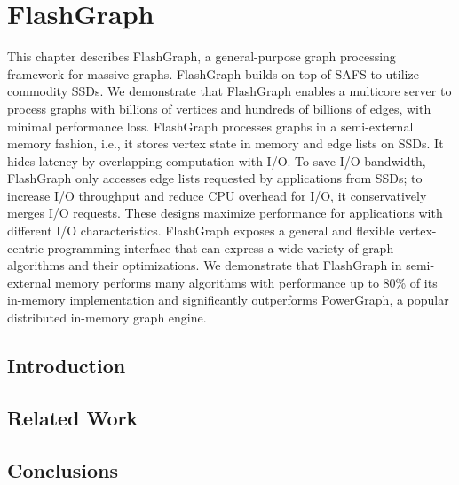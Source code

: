 \chapter{FlashGraph}
\label{sec:fg}

This chapter describes FlashGraph, a general-purpose graph processing framework
for massive graphs. FlashGraph builds on top of SAFS to utilize commodity SSDs.
We demonstrate that FlashGraph enables a multicore server to process graphs
with billions of vertices and hundreds of billions of edges, with minimal
performance loss. FlashGraph
processes graphs in a semi-external memory fashion, i.e., it stores vertex state
in memory and edge lists on SSDs. It hides latency by overlapping computation
with I/O. To save I/O bandwidth, FlashGraph only accesses edge lists requested
by applications from SSDs; to increase I/O throughput and reduce CPU overhead for I/O,
it conservatively merges I/O requests. These designs maximize performance
for applications with different I/O characteristics. FlashGraph exposes
a general and flexible vertex-centric programming interface that can express
a wide variety of graph algorithms and their optimizations. We demonstrate that
FlashGraph in semi-external memory performs many algorithms with performance
up to 80\% of its in-memory implementation and significantly outperforms
PowerGraph, a popular distributed in-memory graph engine.

\section{Introduction}


\section{Related Work}






\section{Conclusions}

